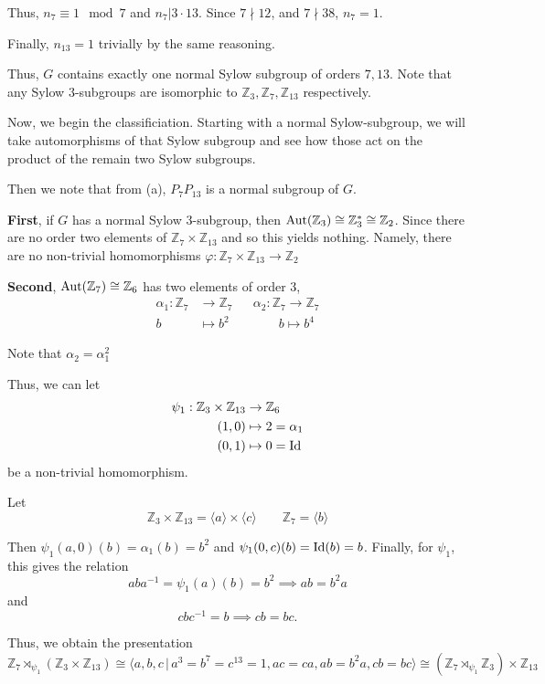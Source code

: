 \documentclass[12pt]{Qual}
\begin{document}
\begin{solution}
\begin{enumerate}[label=(\alph*)]
    Thus, $n_7\equiv 1\mod 7$ and $n_7|3\cdot 13$. Since $7\nmid12$, and $7\nmid38$, $n_7=1$.

    Finally, $n_{13}=1$ trivially by the same reasoning.

    Thus, $G$ contains exactly one normal Sylow subgroup of orders $7,13$. Note that any Sylow $3$-subgroups are isomorphic to $\mathbb{Z}_3,\mathbb{Z}_7,\mathbb{Z}_{13}$ respectively.

    Now, we begin the classificiation. Starting with a normal Sylow-subgroup, we will take automorphisms of that Sylow subgroup and see how those act on the product of the remain two Sylow subgroups.

    Then we note that from (a), $P_7P_{13}$ is a normal subgroup of $G.$

    \textbf{First}, if $G$ has a normal Sylow $3$-subgroup, then $\text{Aut}(\mathbb{Z}_3)\cong\mathbb{Z}_3^*\cong\mathbb{Z}_2$. Since there are no order two elements of $\mathbb{Z}_7\times\mathbb{Z}_{13}$ and so this yields nothing. Namely, there are no non-trivial homomorphisms $\varphi:\mathbb{Z}_7\times\mathbb{Z}_{13}\to\mathbb{Z}_2$

    \textbf{Second}, $\text{Aut}(\mathbb{Z}_7)\cong\mathbb{Z}_6$ has two elements of order $3$, \begin{align*}
        \alpha_1:\mathbb{Z}_7&\to\mathbb{Z}_7 &&\alpha_2:\mathbb{Z}_7\to\mathbb{Z}_7\\
        b&\mapsto b^2 &&\qquad b\mapsto b^4
    \end{align*}

    Note that $\alpha_2=\alpha_1^2$


    Thus, we can let \begin{align*}
        \psi_1:\mathbb{Z}_3\times\mathbb{Z}_{13}&\to\mathbb{Z}_6\\
        (1,0)&\mapsto 2=\alpha_1\\
        (0,1)&\mapsto 0=\text{Id}
    \end{align*} be a non-trivial homomorphism.

    Let $$\mathbb{Z}_3\times\mathbb{Z}_{13}=\langle a\rangle\times\langle c\rangle\qquad\mathbb{Z}_7=\langle b\rangle$$

    Then $\psi_1(a,0)(b)=\alpha_1(b)=b^2$ and $\psi_1(0,c)(b)=\text{Id}(b)=b$. Finally, for $\psi_1$, this gives the relation
    $$aba^{-1}=\psi_1(a)(b)=b^2\implies ab=b^2a$$ and $$cbc^{-1}=b\implies cb=bc.$$

    Thus, we obtain the presentation $$\mathbb{Z}_7\rtimes_{\psi_1}(\mathbb{Z}_3\times\mathbb{Z}_{13})\cong\langle a,b,c\,|\, a^3=b^7=c^{13}=1, ac=ca, ab=b^2a, cb=bc\rangle\cong (\mathbb{Z}_7\rtimes_{\psi_1}\mathbb{Z}_3)\times\mathbb{Z}_{13}$$


\end{enumerate}
\end{solution}
\end{document}
